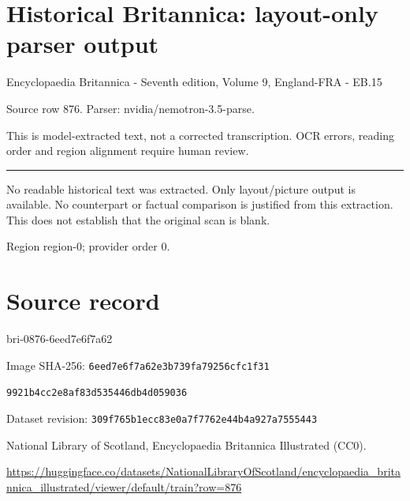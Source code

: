 \documentclass[11pt]{article}
\begin{document}
\section*{Historical Britannica: layout-only parser output}
Encyclopaedia Britannica - Seventh edition, Volume 9, England-FRA - EB.15\par
{\small Source row 876. Parser: nvidia/nemotron-3.5-parse.\par}
{\small This is model-extracted text, not a corrected transcription. OCR errors, reading order and region alignment require human review.\par}
\hrule\medskip
{\color{red} No readable historical text was extracted. Only layout/picture output is available. No counterpart or factual comparison is justified from this extraction. This does not establish that the original scan is blank.\par}


\par

{\scriptsize\color{gray} Region region-0; provider order 0.\par}
\medskip
\newpage\section*{Source record}
bri-0876-6eed7e6f7a62\par
Image SHA-256: \texttt{6eed7e6f7a62e3b739fa79256cfc1f31}\par\texttt{9921b4cc2e8af83d535446db4d059036}\par
Dataset revision: \texttt{309f765b1ecc83e0a7f7}\texttt{762e44b4a927a7555443}\par
National Library of Scotland, Encyclopaedia Britannica Illustrated (CC0).\par
\url{https://huggingface.co/datasets/NationalLibraryOfScotland/encyclopaedia_britannica_illustrated/viewer/default/train?row=876}
\end{document}
